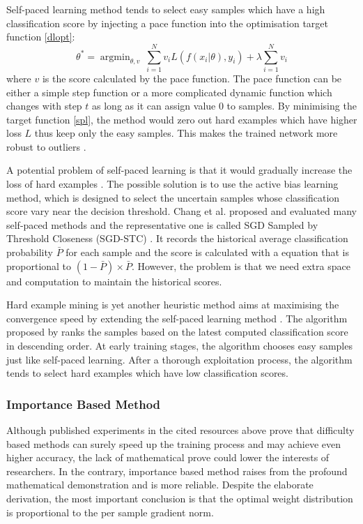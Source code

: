 Self-paced learning method tends to select easy samples which have a high classification score by injecting a pace function into the optimisation target function \ref{dlopt}:
\begin{equation}
\label{spl}
\theta^* = \mathop{\arg\min}_{\theta, v}\ \sum^{N}_{i=1} v_iL(f(x_i|\theta), y_i) + \lambda \sum^{N}_{i=1}  v_i
\end{equation}
where $v$ is the score calculated by the pace function. The pace function can be either a simple step function \cite{Kumar2010} or a more complicated dynamic function which changes with step $t$ \cite{Li2017} as long as it can assign value 0 to samples. By minimising the target function \ref{spl}, the method would zero out hard examples which have higher loss $L$ thus keep only the easy samples. This makes the trained network more robust to outliers \cite{Meng2016}. 

A potential problem of self-paced learning is that it would gradually increase the loss of hard examples \cite{Chang2017}. The possible solution is to use the active bias learning method, which is designed to select the uncertain samples whose classification score vary near the decision threshold. Chang et al. proposed and evaluated many self-paced methods and the representative one is called SGD Sampled by Threshold Closeness (SGD-STC) \cite{Chang2017}. It records the historical average classification probability $\bar{P}$ for each sample and the score is calculated with a equation that is proportional to $(1-\bar{P}) \times \bar{P}$. However, the problem is that we need extra space and computation to maintain the historical scores.

Hard example mining is yet another heuristic method aims at maximising the convergence speed by extending the self-paced learning method \cite{Shrivastava2016}. The algorithm proposed by \cite{Loshchilov2015} ranks the samples based on the latest computed classification score in descending order. At early training stages, the algorithm chooses easy samples just like self-paced learning. After a thorough exploitation process, the algorithm tends to select hard examples which have low classification scores.



\subsubsection{Importance Based Method}
Although published experiments in the cited resources above prove that difficulty based methods can surely speed up the training process and may achieve even higher accuracy, the lack of mathematical prove could lower the interests of researchers. In the contrary, importance based method raises from the profound mathematical demonstration \cite{Zhao2015} and is more reliable. Despite the elaborate derivation, the most important conclusion is that the optimal weight distribution is proportional to the per sample gradient norm.

